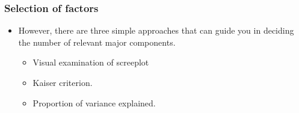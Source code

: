 \documentclass[
  shownotes,
  xcolor={svgnames},
  hyperref={colorlinks,citecolor=DarkBlue,linkcolor=DarkRed,urlcolor=DarkBlue}
  , aspectratio=169]{beamer}
\begin{document}
\begin{frame}
\frametitle{Selection of factors}

\begin{itemize}

\item However, there are three simple approaches that can guide you in deciding the number of relevant major components.
\medskip
\begin{itemize}
  \item Visual examination of screeplot
  \medskip
  \item Kaiser criterion.
  \medskip
  \item Proportion of variance explained.
\end{itemize}


\end{itemize}
\end{frame}
\end{document}
